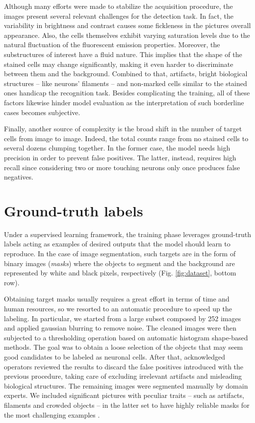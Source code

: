 Although many efforts were made to stabilize the acquisition procedure, the images present several relevant challenges for the detection task. 
In fact, the variability in brightness and contrast causes some fickleness in the pictures overall appearance.  
Also, the cells themselves exhibit varying saturation levels due to the natural fluctuation of the fluorescent emission properties. 
Moreover, the substructures of interest have a fluid nature. This implies that the shape of the stained cells may change significantly, making it even harder to discriminate between them and the background. 
Combined to that, artifacts, bright biological structures -- like neurons' filaments -- and non-marked cells similar to the stained ones handicap the recognition task. 
Besides complicating the training, all of these factors %
likewise hinder model evaluation as the interpretation of such borderline cases becomes subjective.

Finally, another source of complexity is the broad shift in the number of target cells from image to image.
Indeed, the total counts range from no stained cells to several dozens clumping together. 
In the former case, the model needs high precision in order to prevent false positives. The latter, instead,
requires high recall since considering two or more touching neurons only once produces false negatives. 

\section{Ground-truth labels}
Under a supervised learning framework, the training phase leverages ground-truth labels acting as examples of desired outputs that the model should learn to reproduce. In the case of image segmentation, such targets are in the form of binary images (\textit{masks}) where the objects to segment and the background are represented by white and black pixels, respectively (Fig. \ref{fig:dataset}, bottom row).

Obtaining target masks usually requires a great effort in terms of time and human resources, so we resorted to an automatic procedure to speed up the labeling. 
In particular, we started from a large subset composed by 252 images and applied gaussian blurring to remove noise. The cleaned images were then subjected to a thresholding operation based on automatic histogram shape-based methods. 
The goal was to obtain a loose selection of the objects that may seem good candidates to be labeled as neuronal cells. 
After that, acknowledged operators reviewed the results to discard the false positives introduced with the previous procedure, taking care of excluding irrelevant artifacts and misleading biological structures.
The remaining images were segmented manually by domain experts. We included significant pictures with peculiar traits -- such as artifacts, filaments and crowded objects -- in the latter set to have highly reliable masks for the most challenging examples 
.

